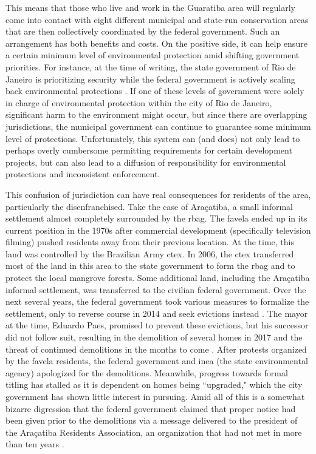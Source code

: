 This means that those who live and work in the Guaratiba area will regularly come into contact with eight different municipal and state-run conservation areas that are then collectively coordinated by the federal government. Such an arrangement has both benefits and costs. On the positive side, it can help ensure a certain minimum level of environmental protection amid shifting government priorities. For instance, at the time of writing, the state government of Rio de Janeiro is prioritizing security \cite{kaiserRioGovernorConfirms2019} while the federal government is actively scaling back environmental protections \cite{simoesBrazilBolsonaroEnvironment2019}. If one of these levels of government were solely in charge of environmental protection within the city of Rio de Janeiro, significant harm to the environment might occur, but since there are overlapping jurisdictions, the municipal government can continue to guarantee some minimum level of protections. Unfortunately, this system can (and does) not only lead to perhaps overly cumbersome permitting requirements for certain development projects, but can also lead to a diffusion of responsibility for environmental protections and inconsistent enforcement. 
 
This confusion of jurisdiction can have real consequences for residents of the area, particularly the disenfranchised. Take the case of Araçatiba, a small informal settlement almost completely surrounded by the \ac{rbag}. The favela ended up in its current position in the 1970s after commercial development (specifically television filming) pushed residents away from their previous location. At the time, this land was controlled by the Brazilian Army \ac{ctex}. In 2006, the \ac{ctex} transferred most of the land in this area to the state government to form the \ac{rbag} and to protect the local mangrove forests. Some additional land, including the Araçatiba informal settlement, was transferred to the civilian federal government. Over the next several years, the federal government took various measures to formalize the settlement, only to reverse course in 2014 and seek evictions instead \cite{chisholmWhoInvadingWhom2017}. The mayor at the time, Eduardo Paes, promised to prevent these evictions, but his successor did not follow suit, resulting in the demolition of several homes in 2017 and the threat of continued demolitions in the months to come \cite{stroblSOSAracatibaCommunity2018}. After protests organized by the favela residents, the federal government and \ac{inea} (the state environmental agency) apologized for the demolitions. Meanwhile, progress towards formal titling has stalled as it is dependent on homes being ``upgraded," which the city government has shown little interest in pursuing. Amid all of this is a somewhat bizarre digression that the federal government claimed that proper notice had been given prior to the demolitions via a message delivered to the president of the Araçatiba Residents Association, an organization that had not met in more than ten years \cite{stroblFourCoreCriticisms2018}. 

